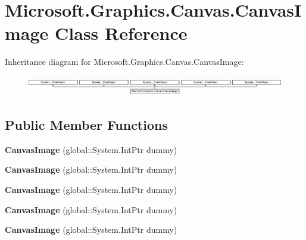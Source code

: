 \hypertarget{class_microsoft_1_1_graphics_1_1_canvas_1_1_canvas_image}{}\section{Microsoft.\+Graphics.\+Canvas.\+Canvas\+Image Class Reference}
\label{class_microsoft_1_1_graphics_1_1_canvas_1_1_canvas_image}
Inheritance diagram for Microsoft.\+Graphics.\+Canvas.\+Canvas\+Image\+:\begin{figure}[H]
\begin{center}
\leavevmode
\includegraphics[height=0.878431cm]{class_microsoft_1_1_graphics_1_1_canvas_1_1_canvas_image}
\end{center}
\end{figure}
\subsection*{Public Member Functions}
\begin{DoxyCompactItemize}
\item 
\mbox{\label{class_microsoft_1_1_graphics_1_1_canvas_1_1_canvas_image_a713a2d81a64d649b640d074ac9b14b99}} 
{\bfseries Canvas\+Image} (global\+::\+System.\+Int\+Ptr dummy)
\item 
\mbox{\label{class_microsoft_1_1_graphics_1_1_canvas_1_1_canvas_image_a713a2d81a64d649b640d074ac9b14b99}} 
{\bfseries Canvas\+Image} (global\+::\+System.\+Int\+Ptr dummy)
\item 
\mbox{\label{class_microsoft_1_1_graphics_1_1_canvas_1_1_canvas_image_a713a2d81a64d649b640d074ac9b14b99}} 
{\bfseries Canvas\+Image} (global\+::\+System.\+Int\+Ptr dummy)
\item 
\mbox{\label{class_microsoft_1_1_graphics_1_1_canvas_1_1_canvas_image_a713a2d81a64d649b640d074ac9b14b99}} 
{\bfseries Canvas\+Image} (global\+::\+System.\+Int\+Ptr dummy)
\item 
\mbox{\label{class_microsoft_1_1_graphics_1_1_canvas_1_1_canvas_image_a713a2d81a64d649b640d074ac9b14b99}} 
{\bfseries Canvas\+Image} (global\+::\+System.\+Int\+Ptr dummy)
\end{DoxyCompactItemize}
